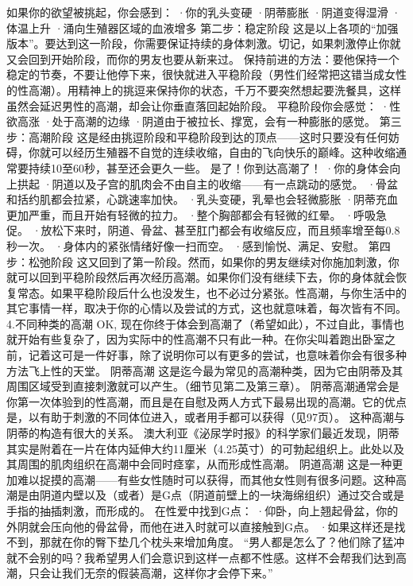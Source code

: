 \documentclass[12pt,UTF8]{ctexbook}
\begin{document}
如果你的欲望被挑起，你会感到：
·你的乳头变硬
·阴蒂膨胀
·阴道变得湿滑
·体温上升
·涌向生殖器区域的血液增多
第二步：稳定阶段
这是以上各项的“加强版本”。要达到这一阶段，你需要保证持续的身体刺激。切记，如果刺激停止你就又会回到开始阶段，而你的男友也要从新来过。
保持前进的方法：要他保持一个稳定的节奏，不要让他停下来，很快就进入平稳阶段（男性们经常把这错当成女性的性高潮）。用精神上的挑逗来保持你的状态，千万不要突然想起要洗餐具，这样虽然会延迟男性的高潮，却会让你垂直落回起始阶段。
平稳阶段你会感觉：
·性欲高涨
·处于高潮的边缘
·阴道由于被拉长、撑宽，会有一种膨胀的感觉。
第三步：高潮阶段
这是经由挑逗阶段和平稳阶段到达的顶点——这时只要没有任何妨碍，你就可以经历生殖器不自觉的连续收缩，自由的飞向快乐的巅峰。这种收缩通常要持续10至60秒，甚至还会更久一些。
是了！你到达高潮了！
·你的身体会向上拱起
·阴道以及子宫的肌肉会不由自主的收缩——有一点跳动的感觉。
·骨盆和括约肌都会拉紧，心跳速率加快。
·乳头变硬，乳晕也会轻微膨胀
·阴蒂充血更加严重，而且开始有轻微的拉力。
·整个胸部都会有轻微的红晕。
·呼吸急促。
·放松下来时，阴道、骨盆、甚至肛门都会有收缩反应，而且频率增至每0.8秒一次。
·身体内的紧张情绪好像一扫而空。
·感到愉悦、满足、安慰。
第四步：松弛阶段
这又回到了第一阶段。然而，如果你的男友继续对你施加刺激，你就可以回到平稳阶段然后再次经历高潮。如果你们没有继续下去，你的身体就会恢复常态。如果平稳阶段后什么也没发生，也不必过分紧张。性高潮，与你生活中的其它事情一样，取决于你的心情以及尝试的方式，这也就意味着，每次皆有不同。
4.不同种类的高潮
OK, 现在你终于体会到高潮了（希望如此），不过自此，事情也就开始有些复杂了，因为实际中的性高潮不只有此一种。在你尖叫着跑出卧室之前，记着这可是一件好事，除了说明你可以有更多的尝试，也意味着你会有很多种方法飞上性的天堂。
阴蒂高潮
这是迄今最为常见的高潮种类，因为它由阴蒂及其周围区域受到直接刺激就可以产生。（细节见第二及第三章）。
阴蒂高潮通常会是你第一次体验到的性高潮，而且是在自慰及两人方式下最易出现的高潮。它的优点是，以有助于刺激的不同体位进入，或者用手都可以获得（见97页）。
这种高潮与阴蒂的构造有很大的关系。
澳大利亚《泌尿学时报》的科学家们最近发现，阴蒂其实是附着在一片在体内延伸大约11厘米（4.25英寸）的可勃起组织上。此处以及其周围的肌肉组织在高潮中会同时痉挛，从而形成性高潮。
阴道高潮
这是一种更加难以捉摸的高潮——有些女性随时可以获得，而其他女性则有很多问题。这种高潮是由阴道内壁以及（或者）是G点（阴道前壁上的一块海绵组织）通过交合或是手指的抽插刺激，而形成的。
在性爱中找到G点：
·仰卧，向上翘起骨盆，你的外阴就会压向他的骨盆骨，而他在进入时就可以直接触到G点。
·如果这样还是找不到，那就在你的臀下垫几个枕头来增加角度。
“男人都是怎么了？他们除了猛冲就不会别的吗？我希望男人们会意识到这样一点都不性感。这样不会帮我们达到高潮，只会让我们无奈的假装高潮，这样你才会停下来。”
\end{document}
